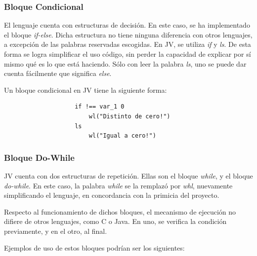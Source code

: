\documentclass{article}
\begin{document}
            \subsubsection{Bloque Condicional}
                \par El lenguaje cuenta con estructuras de decisión. En este caso, se ha implementado el bloque \textit{if-else}. Dicha estructura no tiene ninguna diferencia con otros lenguajes, a excepción de las palabras reservadas escogidas. En JV, se utiliza \textit{if} y \textit{ls}. De esta forma se logra simplificar el uso código, sin perder la capacidad de explicar por sí mismo qué es lo que está haciendo. Sólo con leer la palabra \textit{ls}, uno se puede dar cuenta fácilmente que significa \textit{else}.
                \par Un bloque condicional en JV tiene la siguiente forma:

                \begin{lstlisting}
                    if !== var_1 0
                        wl("Distinto de cero!")
                    ls
                        wl("Igual a cero!")
                \end{lstlisting}      


            \subsubsection{Bloque Do-While}

                \par JV cuenta con dos estructuras de repetición. Ellas son el bloque \textit{while}, y el bloque \textit{do-while}. En este caso, la palabra \textit{while} se la remplazó por \textit{whl}, nuevamente simplificando el lenguaje, en concordancia con la primicia del proyecto.
                \par Respecto al funcionamiento de dichos bloques, el mecanismo de ejecución no difiere de otros lenguajes, como C o Java. En uno, se verifica la condición previamente, y en el otro, al final.
                \par Ejemplos de uso de estos bloques podrían ser los siguientes:
\end{document}
